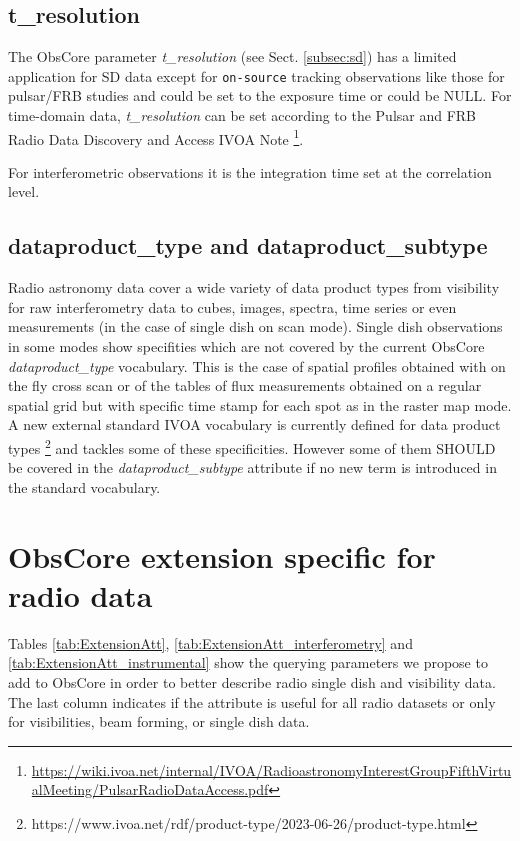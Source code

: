\documentclass[11pt,a4paper]{ivoa}
\begin{document}
\subsection{t\_resolution}
The ObsCore parameter \emph{t\_resolution} (see Sect. \ref{subsec:sd}) has a limited application for SD data
except for \texttt{on-source} tracking observations like those for pulsar/FRB studies and could be set to the
exposure time or could be NULL. For time-domain data, \emph{t\_resolution} can be set according to the Pulsar
and FRB Radio Data Discovery and Access IVOA Note \footnote{\url{https://wiki.ivoa.net/internal/IVOA/RadioastronomyInterestGroupFifthVirtualMeeting/PulsarRadioDataAccess.pdf}}.

For interferometric observations it is the integration time set at the correlation level.

\subsection{dataproduct\_type and dataproduct\_subtype}

Radio astronomy data cover a wide variety of data product types from visibility for raw interferometry data to cubes, images, spectra, time series
or even measurements (in the case of single dish on scan mode). Single dish observations in some modes show specifities which are not covered by
the current ObsCore \emph{dataproduct\_type} vocabulary. This is the case of spatial profiles obtained with on the fly cross scan or of the
tables of flux measurements obtained on a regular spatial grid but with specific time stamp for each spot as in the raster map  mode.
A new external standard IVOA vocabulary is currently defined for data product types \footnote{https://www.ivoa.net/rdf/product-type/2023-06-26/product-type.html}
and tackles some of these specificities. However some of them SHOULD be covered in the \emph{dataproduct\_subtype} attribute if no new term is introduced in the standard vocabulary.

\section{ObsCore extension specific for radio data}

Tables \ref{tab:ExtensionAtt}, \ref{tab:ExtensionAtt_interferometry} and \ref{tab:ExtensionAtt_instrumental} show the %
querying parameters we propose to add to ObsCore in order to better describe radio single dish and visibility data.
The last column indicates if the attribute is useful for all radio datasets or only for visibilities, beam forming, or single dish data.
\end{document}
